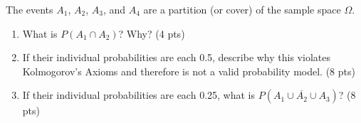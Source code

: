 
\item The events $A_1$, $A_2$, $A_3$, and $A_4$ are a partition (or cover) of the sample space $\Omega$.

\begin{enumerate}

\item What is $P(A_1 \cap A_2)$? Why? (4 pts)

\vfill

\item If their individual probabilities are each 0.5, describe why this violates Kolmogorov's Axioms and therefore is not a valid probability model. (8 pts)

\vfill \vfill

\item If their individual probabilities are each 0.25, what is $P(\overline{A_1 \cup A_2 \cup A_3})$? (8 pts)

\ansfont{
\[ P(\overline{A_1 \cup A_2 \cup A_3}) = 1-P(A_1 \cup A_2 \cup A_3) = 1-P(A_1)-P(A_2)-P(A_3) = P(A_4) = 0.25 \] 
}
\vfill \vfill

\end{enumerate}
